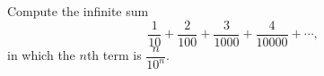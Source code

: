 Compute the infinite sum
\[\dfrac{1}{10}+\dfrac{2}{100}+\dfrac{3}{1000}+\dfrac{4}{10000}+\cdots,\]
in which the $n$th term is $\dfrac{n}{10^n}$.
